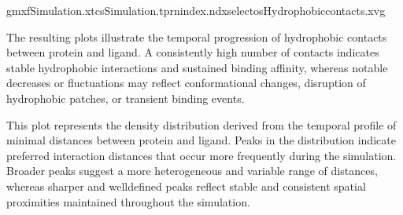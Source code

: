 \documentclass[a4paper,10pt,english]{sphinxmanual}
\let\sphinxpxdimen\pdfpxdimen\else\newdimen\sphinxpxdimen
\begin{document}
\sphinxAtStartPar
{}

\begin{sphinxVerbatim}[commandchars=\\\{\}]
gmx\PYGZhy{}fSimulation.xtc\PYGZhy{}sSimulation.tpr\PYGZhy{}nindex.ndx\PYGZhy{}select\PYGZhy{}osHydrophobic\PYGZus{}contacts.xvg
\end{sphinxVerbatim}

\begin{sphinxVerbatim}[commandchars=\\\{\}]
   
\end{sphinxVerbatim}

\noindent{}

\sphinxAtStartPar
{} The resulting plots illustrate the temporal progression of hydrophobic contacts between protein and ligand. A consistently high number of contacts indicates stable hydrophobic interactions and sustained binding affinity, whereas notable decreases or fluctuations may reflect conformational changes, disruption of hydrophobic patches, or transient binding events.

\begin{sphinxVerbatim}[commandchars=\\\{\}]
  
\end{sphinxVerbatim}

\noindent{\hspace*{\fill}\sphinxincludegraphics[width=500\sphinxpxdimen]{{Hydrophobic_contacts_density}.png}\hspace*{\fill}}

\sphinxAtStartPar
{} This plot represents the density distribution derived from the temporal profile of minimal distances between protein and ligand. Peaks in the distribution indicate preferred interaction distances that occur more frequently during the simulation. Broader peaks suggest a more heterogeneous and variable range of distances, whereas sharper and well\sphinxhyphen{}defined peaks reflect stable and consistent spatial proximities maintained throughout the simulation.
\end{document}
